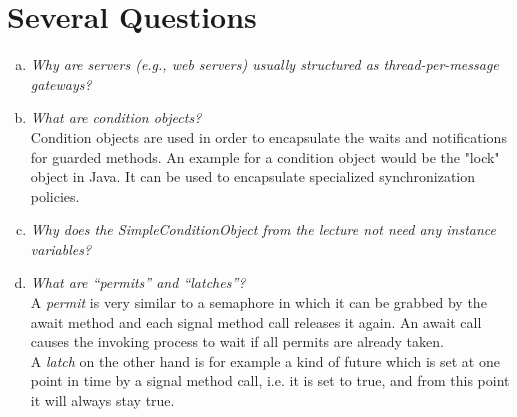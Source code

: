 \documentclass{report}
\author{Marcel \textsc{Zauder} 16-124-836 \\
	Pascal \textsc{Gerig} 16-104-721}
\begin{document}
	\section{Several Questions}
	\startsection
		\begin{enumerate}[a)]
			\item \textit{Why are servers (e.g., web servers) usually structured as thread-per-message gateways?} \\
			\item \textit{What are condition objects?} \\
			Condition objects are used in order to encapsulate the waits and notifications for guarded methods. An example for a condition object would be the "lock" object in Java. It can be used to encapsulate specialized synchronization policies.
			\item \textit{Why does the SimpleConditionObject from the lecture not need any instance variables?} \\
			\item \textit{What are “permits” and “latches”?} \\
			A \textit{permit} is very similar to a semaphore in which it can be grabbed by the await method and each signal method call releases it again. An await call causes the invoking process to wait if all permits are already taken. \\
			A \textit{latch} on the other hand is for example a kind of future which is set at one point in time by a signal method call, i.e. it is set to true, and from this point it will always stay true.
		\end{enumerate}
	\closesection
	
\end{document}
